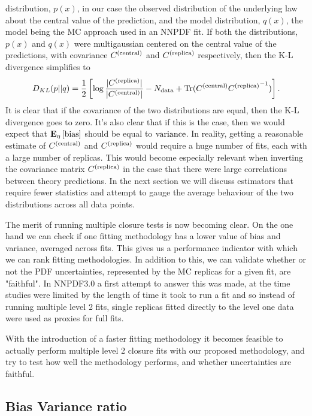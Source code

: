 distribution, $p(x)$, in our case the observed distribution of the underlying law
about the central value of the prediction, and the model distribution, $q(x)$,
the model being the MC approach used in an NNPDF fit. If both the distributions,
$p(x)$ and $q(x)$ were multigaussian centered on the central value of the
predictions, with covariance $C^{(\rm central)}$ and
$C^{(\rm replica)}$ respectively, then the K-L divergence simplifies to
\begin{equation}
    D_{KL}(p || q) = \frac{1}{2} \left[
        \log\frac{|C^{(\rm replica)}|}{|C^{(\rm central)}|}
        - N_{\rm data}
        + {\rm Tr} (C^{(\rm central)} {C^{(\rm replica)}}^{-1})
        \right].
\end{equation}
It is clear that if the covariance of the two distributions are equal, then
the K-L divergence goes to zero. It's also clear that if this is the case,
then we would expect that $\mathbf{E}_{\eta}\left[ {\rm bias} \right]$ should be equal to ${\rm variance}$. In reality,
getting a reasonable estimate of $C^{(\rm central)}$ and $C^{(\rm replica)}$ would require a huge
number of fits, each with a large number of replicas. This would become
especially relevant when inverting the covariance matrix $C^{(\rm replica)}$ in the case
that there were large correlations between theory predictions. In the next
section we will discuss estimators that require fewer statistics and attempt
to gauge the average behaviour of the two distributions across all data points.

The merit of running multiple closure tests is now becoming clear. On the one
hand we can check if one fitting methodology has a lower value of bias and
variance, averaged across fits. This gives us a performance indicator with
which we can rank fitting methodologies. In addition to this, we can validate
whether or not the PDF uncertainties, represented by the MC replicas for a given
fit, are "faithful". In NNPDF3.0 a first attempt to answer this was made,
at the time studies were limited by the length of
time it took to run a fit
and so instead of running multiple level 2 fits, single replicas fitted directly
to the level one data were used as proxies for full fits.

With the introduction of a faster fitting methodology it becomes feasible to
actually perform multiple level 2 closure fits with our proposed methodology,
and try to test how well the methodology performs, and whether uncertainties
are faithful.

\subsection{Bias Variance ratio}

